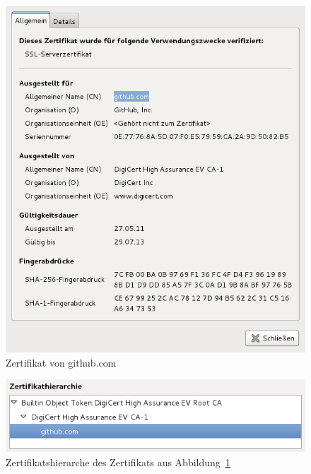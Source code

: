 \documentclass[11pt,a4paper]{scrartcl}
\begin{document}
\begin{figure}[h]
  \centering
  \includegraphics[scale=.5]{github.png}
  \caption{Zertifikat von github.com}
  \label{fig:zertifikat_github}
\end{figure}

\begin{figure}[h]
  \centering
  \includegraphics[scale=.5]{hierarchie.png}
  \caption{Zertifikatshierarche des Zertifikats aus
    Abbildung~\ref{fig:zertifikat_github}}
  \label{fig:hierarchie}
\end{figure}
\end{document}
